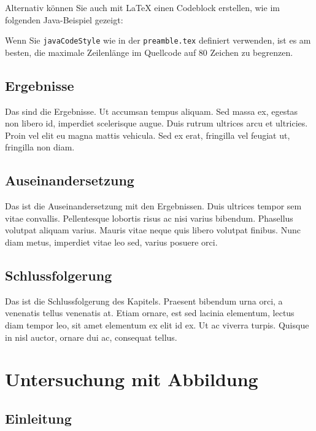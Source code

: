 \documentclass[listof=totoc,index=totoc,bibliography=totoc,12pt,german,a4paper,]{report}
\begin{document}
Alternativ können Sie auch mit LaTeX einen Codeblock erstellen, wie im
folgenden Java-Beispiel gezeigt:



Wenn Sie \texttt{javaCodeStyle} wie in der \texttt{preamble.tex}
definiert verwenden, ist es am besten, die maximale Zeilenlänge im
Quellcode auf 80 Zeichen zu begrenzen.

\section{Ergebnisse}\label{ergebnisse}

Das sind die Ergebnisse. Ut accumsan tempus aliquam. Sed massa ex,
egestas non libero id, imperdiet scelerisque augue. Duis rutrum ultrices
arcu et ultricies. Proin vel elit eu magna mattis vehicula. Sed ex erat,
fringilla vel feugiat ut, fringilla non diam.

\section{Auseinandersetzung}\label{auseinandersetzung}

Das ist die Auseinandersetzung mit den Ergebnissen. Duis ultrices tempor
sem vitae convallis. Pellentesque lobortis risus ac nisi varius
bibendum. Phasellus volutpat aliquam varius. Mauris vitae neque quis
libero volutpat finibus. Nunc diam metus, imperdiet vitae leo sed,
varius posuere orci.

\section{Schlussfolgerung}\label{schlussfolgerung}

Das ist die Schlussfolgerung des Kapitels. Praesent bibendum urna orci,
a venenatis tellus venenatis at. Etiam ornare, est sed lacinia
elementum, lectus diam tempor leo, sit amet elementum ex elit id ex. Ut
ac viverra turpis. Quisque in nisl auctor, ornare dui ac, consequat
tellus.

\chapter{Untersuchung mit Abbildung}\label{sec:research-figure}

\section{Einleitung}\label{einleitung-2}
\end{document}
